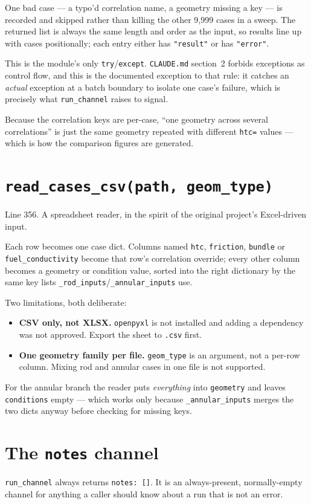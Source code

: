 \documentclass[11pt]{article}
\newcommand{\code}[1]{\texttt{#1}}
\begin{document}
One bad case --- a typo'd correlation name, a geometry missing a key --- is recorded and
skipped rather than killing the other 9,999 cases in a sweep. The returned list is
always the same length and order as the input, so results line up with cases
positionally; each entry either has \code{"result"} or has \code{"error"}.

This is the module's only \code{try}/\code{except}. \code{CLAUDE.md} section~2 forbids
exceptions as control flow, and this is the documented exception to that rule: it catches
an \emph{actual} exception at a batch boundary to isolate one case's failure, which is
precisely what \code{run\_channel} raises to signal.

Because the correlation keys are per-case, ``one geometry across several correlations''
is just the same geometry repeated with different \code{htc=} values --- which is how the
comparison figures are generated.

\section{\code{read\_cases\_csv(path, geom\_type)}}
Line 356. A spreadsheet reader, in the spirit of the original project's Excel-driven
input.

Each row becomes one case dict. Columns named \code{htc}, \code{friction},
\code{bundle} or \code{fuel\_conductivity} become that row's correlation override;
every other column becomes a geometry or condition value, sorted into the right
dictionary by the same key lists \code{\_rod\_inputs}/\code{\_annular\_inputs} use.

Two limitations, both deliberate:
\begin{itemize}
\item \textbf{CSV only, not XLSX.} \code{openpyxl} is not installed and adding a
      dependency was not approved. Export the sheet to \code{.csv} first.
\item \textbf{One geometry family per file.} \code{geom\_type} is an argument, not a
      per-row column. Mixing rod and annular cases in one file is not supported.
\end{itemize}

For the annular branch the reader puts \emph{everything} into \code{geometry} and leaves
\code{conditions} empty --- which works only because \code{\_annular\_inputs} merges the
two dicts anyway before checking for missing keys.

\section{The \code{notes} channel}
\label{sec:notes}
\code{run\_channel} always returns \code{notes: []}. It is an always-present,
normally-empty channel for anything a caller should know about a run that is not an
error.
\end{document}
